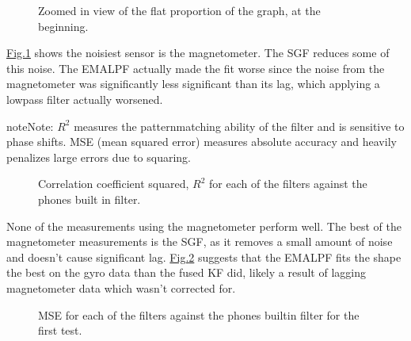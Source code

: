\documentclass[letterpaper,10pt,english]{jupyterBook}
\begin{document}
\begin{figure}[htbp]
\centering
\capstart

\noindent{}
\caption{Zoomed in view of the flat proportion of the graph, at the beginning.}\label{\detokenize{8TestingFilters:high-freq-oscillation-zoomed-flat}}\end{figure}

\sphinxAtStartPar
\hyperref[\detokenize{8TestingFilters:high-freq-oscillation-zoomed-flat}]{Fig.\@ \ref{\detokenize{8TestingFilters:high-freq-oscillation-zoomed-flat}}} shows the noisiest sensor is the magnetometer. The SGF reduces some of this noise. The EMALPF actually made the fit worse since the noise from the magnetometer was significantly less significant than its lag, which applying a low\sphinxhyphen{}pass filter actually worsened.

\begin{sphinxadmonition}{note}{Note:}
\sphinxAtStartPar
\(R^2\) measures the pattern\sphinxhyphen{}matching ability of the filter and is sensitive to phase shifts.
MSE (mean squared error) measures absolute accuracy and heavily penalizes large errors due to squaring.
\end{sphinxadmonition}

\begin{figure}[htbp]
\centering
\capstart

\noindent{}
\caption{Correlation coefficient squared, \(R^2\) for each of the filters against the phones built in filter.}\label{\detokenize{8TestingFilters:fig-correlation-coefficient}}\end{figure}

\sphinxAtStartPar
None of the measurements using the magnetometer perform well. The best of the magnetometer measurements is the SGF, as it removes a small amount of noise and doesn’t cause significant lag. \hyperref[\detokenize{8TestingFilters:fig-correlation-coefficient}]{Fig.\@ \ref{\detokenize{8TestingFilters:fig-correlation-coefficient}}} suggests that the EMALPF fits the shape the best on the gyro data than the fused KF did, likely a result of lagging magnetometer data which wasn’t corrected for.

\begin{figure}[htbp]
\centering
\capstart

\noindent{}
\caption{MSE for each of the filters against the phones builtin filter for the first test.}\label{\detokenize{8TestingFilters:fig-mean-squared-error}}\end{figure}
\end{document}

